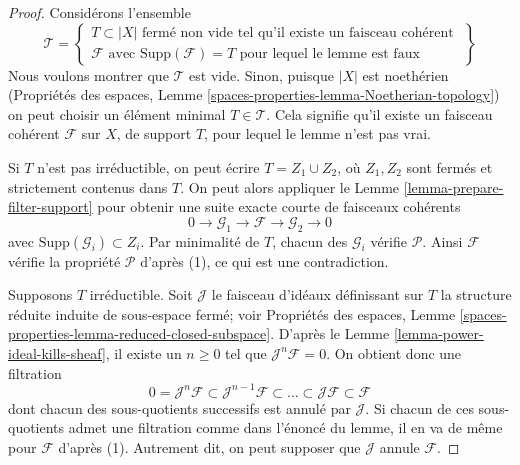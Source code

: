 \begin{proof}
Considérons l'ensemble
$$
\mathcal{T} =
\left\{
\begin{matrix}
T \subset |X|
\text{ fermé non vide tel qu'il existe un faisceau cohérent } \\
\mathcal{F}
\text{ avec }
\text{Supp}(\mathcal{F}) = T
\text{ pour lequel le lemme est faux}
\end{matrix}
\right\}
$$
Nous voulons montrer que $\mathcal{T}$ est vide. Sinon,
puisque $|X|$ est noethérien (Propriétés des espaces, Lemme
\ref{spaces-properties-lemma-Noetherian-topology})
on peut choisir un élément minimal $T \in \mathcal{T}$. Cela signifie qu'il
existe un faisceau cohérent $\mathcal{F}$ sur $X$, de support $T$,
pour lequel le lemme n'est pas vrai.

\medskip\noindent
Si $T$ n'est pas irréductible, on peut écrire $T = Z_1 \cup Z_2$,
où $Z_1, Z_2$ sont fermés et strictement contenus dans $T$.
On peut alors appliquer le Lemme \ref{lemma-prepare-filter-support}
pour obtenir une suite exacte courte de faisceaux cohérents
$$
0 \to
\mathcal{G}_1 \to
\mathcal{F} \to
\mathcal{G}_2 \to 0
$$
avec $\text{Supp}(\mathcal{G}_i) \subset Z_i$. Par minimalité de
$T$, chacun des $\mathcal{G}_i$ vérifie $\mathcal{P}$. Ainsi $\mathcal{F}$
vérifie la propriété $\mathcal{P}$ d'après (1), ce qui est une contradiction.

\medskip\noindent
Supposons $T$ irréductible. Soit $\mathcal{J}$ le faisceau d'idéaux
définissant sur $T$ la structure réduite induite de sous-espace fermé;
voir Propriétés des espaces, Lemme
\ref{spaces-properties-lemma-reduced-closed-subspace}.
D'après le Lemme \ref{lemma-power-ideal-kills-sheaf}, il existe
un $n \geq 0$ tel que $\mathcal{J}^n\mathcal{F} = 0$. On obtient donc
une filtration
$$
0 = \mathcal{J}^n\mathcal{F} \subset \mathcal{J}^{n - 1}\mathcal{F}
\subset \ldots \subset \mathcal{J}\mathcal{F} \subset \mathcal{F}
$$
dont chacun des sous-quotients successifs est annulé par $\mathcal{J}$.
Si chacun de ces sous-quotients admet une filtration comme dans l'énoncé
du lemme, il en va de même pour $\mathcal{F}$ d'après (1). Autrement dit, on peut
supposer que $\mathcal{J}$ annule $\mathcal{F}$.


\end{proof}
